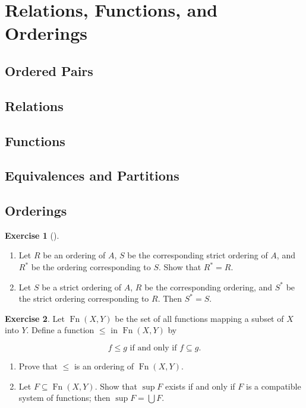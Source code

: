 \documentclass[a4paper,11pt]{article}
\DeclareMathOperator{\Fn}{Fn}
\theoremstyle{definition}
\newtheorem{exercise}{Exercise}[subsection]
\newenvironment{exercisebreak}[1][]{%
  \begin{exercise}[#1]$ $\par\nobreak\ignorespaces
}{%
  \end{exercise}
}
\begin{document}
\section{Relations, Functions, and Orderings}

\subsection{Ordered Pairs}

\subsection{Relations}

\subsection{Functions}

\subsection{Equivalences and Partitions}

\subsection{Orderings}

\begin{exercisebreak}
  \begin{enumerate}
  \item Let \(R\) be an ordering of \(A\), \(S\) be the corresponding strict
    ordering of \(A\), and \(R^{*}\) be the ordering corresponding to \(S\).
    Show that \(R^{*} = R\).
  \item Let \(S\) be a strict ordering of \(A\), \(R\) be the corresponding
    ordering, and \(S^{*}\) be the strict ordering corresponding to \(R\). Then
    \(S^{*} = S\).
  \end{enumerate}
\end{exercisebreak}

\begin{exercise}
  Let \(\Fn(X, Y)\) be the set of all functions mapping a subset of \(X\) into
  \(Y\). Define a function \(\le\) in \(\Fn(X, Y)\) by

  \[f \le g \text{ if and only if } f \subseteq g.\]
  \begin{enumerate}
  \item Prove that \(\le\) is an ordering of \(\Fn(X, Y)\).
  \item Let \(F \subseteq \Fn(X, Y)\). Show that \(\sup F\) exists if and only if
    \(F\) is a compatible system of functions; then \(\sup F = \bigcup F\).
  \end{enumerate}
\end{exercise}
\end{document}
